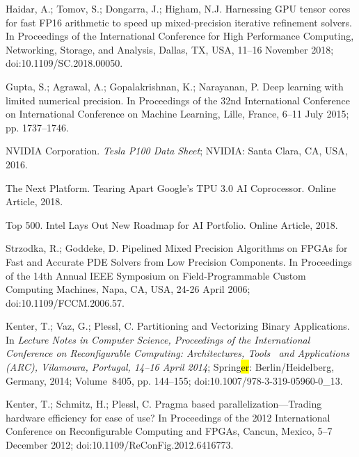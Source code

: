 \documentclass[computation,article,accept,moreauthors,pdftex]{Definitions/mdpi}
\begin{document}
\begin{thebibliography}{999}
Haidar, A.; Tomov, S.; Dongarra, J.; Higham, N.J.
\newblock Harnessing GPU tensor cores for fast FP16 arithmetic to speed up
 mixed-precision iterative refinement solvers.
\newblock In Proceedings of the International Conference for High Performance
 Computing, Networking, Storage, and Analysis, Dallas, TX, USA, 11--16 November 2018; doi:10.1109/SC.2018.00050.

Gupta, S.; Agrawal, A.; Gopalakrishnan, K.; Narayanan, P.
\newblock Deep learning with limited numerical precision.
\newblock In Proceedings of the 32nd International Conference on International
 Conference on Machine Learning, Lille, France, 6--11 July 2015; pp. 1737--1746.

{NVIDIA Corporation}.
\newblock \emph{Tesla {P100} Data Sheet}; NVIDIA: Santa Clara, CA, USA, 2016.


{The Next Platform}.
\newblock Tearing Apart {Google's} {TPU} 3.0 {AI} Coprocessor.
\newblock Online Article, 2018.

{Top 500}.
\newblock Intel Lays Out New Roadmap for {AI} Portfolio.
\newblock Online Article, 2018.

Strzodka, R.; Goddeke, D.
\newblock Pipelined Mixed Precision Algorithms on FPGAs for Fast and Accurate
 PDE Solvers from Low Precision Components.
\newblock In Proceedings of the 14th Annual IEEE Symposium on Field-Programmable Custom Computing
 Machines, Napa, CA, USA, 24-26 April 2006; doi:10.1109/FCCM.2006.57.

Kenter, T.; Vaz, G.; Plessl, C.
\newblock Partitioning and Vectorizing Binary Applications.
\newblock In \emph{Lecture Notes in
 Computer Science, Proceedings of the International Conference on Reconfigurable Computing: Architectures, Tools~
 and Applications (ARC), Vilamoura, Portugal, 14--16 April 2014}; Spring\hl{er}: Berlin/Heidelberg, Germany, %
 2014;
Volume~8405, pp. 144--155; doi:10.1007/978-3-319-05960-0\_13.

Kenter, T.; Schmitz, H.; Plessl, C.
\newblock Pragma based parallelization---Trading hardware efficiency for ease
 of use?
\newblock In Proceedings of the 2012 International Conference on Reconfigurable Computing and FPGAs, Cancun, Mexico, 5--7 December 2012; doi:10.1109/ReConFig.2012.6416773.


\end{thebibliography}
\end{document}
